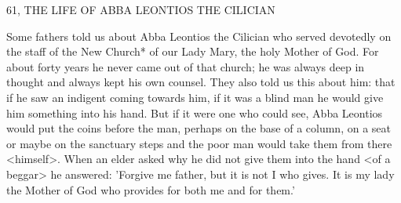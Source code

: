 61, THE LIFE OF ABBA LEONTIOS THE CILICIAN

Some fathers told us about Abba Leontios the Cilician who served
devotedly on the staff of the New Church* of our Lady Mary, the
holy Mother of God. For about forty years he never came out of
that church; he was always deep in thought and always kept his
own counsel. They also told us this about him: that if he saw an
indigent coming towards him, if it was a blind man he would give
him something into his hand. But if it were one who could see,
Abba Leontios would put the coins before the man, perhaps on the
base of a column, on a seat or maybe on the sanctuary steps and
the poor man would take them from there <himself>. When an
elder asked why he did not give them into the hand <of a beggar>
he answered: 'Forgive me father, but it is not I who gives. It is my
lady the Mother of God who provides for both me and for them.'

